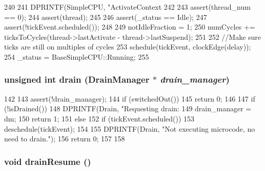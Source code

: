 \begin{DoxyCode}
240 {
241     DPRINTF(SimpleCPU, "ActivateContext %
242 
243     assert(thread_num == 0);
244     assert(thread);
245 
246     assert(_status == Idle);
247     assert(!tickEvent.scheduled());
248 
249     notIdleFraction = 1;
250     numCycles += ticksToCycles(thread->lastActivate - thread->lastSuspend);
251 
252     //Make sure ticks are still on multiples of cycles
253     schedule(tickEvent, clockEdge(delay));
254     _status = BaseSimpleCPU::Running;
255 }
\end{DoxyCode}
\hypertarget{classAtomicSimpleCPU_a4e932bfc8aa6dfb998b8496a0f04ace3}{
\subsubsection[{drain}]{\setlength{\rightskip}{0pt plus 5cm}unsigned int drain ({\bf DrainManager} $\ast$ {\em drain\_\-manager})}}
\label{classAtomicSimpleCPU_a4e932bfc8aa6dfb998b8496a0f04ace3}



\begin{DoxyCode}
142 {
143     assert(!drain_manager);
144     if (switchedOut())
145         return 0;
146 
147     if (!isDrained()) {
148         DPRINTF(Drain, "Requesting drain: %
149         drain_manager = dm;
150         return 1;
151     } else {
152         if (tickEvent.scheduled())
153             deschedule(tickEvent);
154 
155         DPRINTF(Drain, "Not executing microcode, no need to drain.\n");
156         return 0;
157     }
158 }
\end{DoxyCode}
\hypertarget{classAtomicSimpleCPU_a8f020d3237536fe007fc488c4125c5d8}{
\subsubsection[{drainResume}]{\setlength{\rightskip}{0pt plus 5cm}void drainResume ()}}
\label{classAtomicSimpleCPU_a8f020d3237536fe007fc488c4125c5d8}



